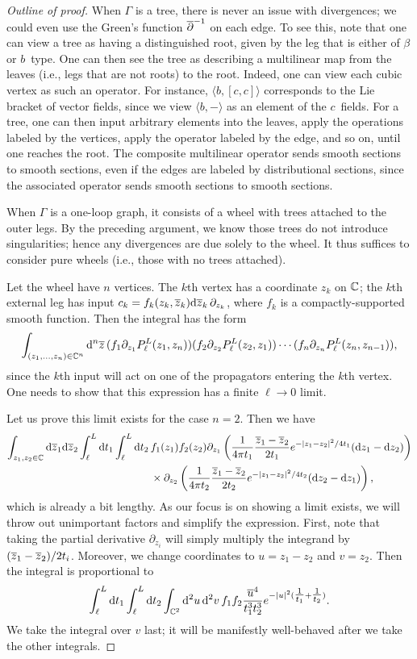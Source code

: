 \begin{proof}[Outline of proof]
When $\Gamma$ is a tree, there is never an issue with divergences; 
we could even use the Green's function $\overline{\partial}^{-1}$ on each edge.
To see this, note that one can view a tree as having a distinguished root,
given by the leg that is either of $\beta$ or $b$~type.
One can then see the tree as describing a multilinear map from the leaves (i.e., legs that are not roots) to the root.
Indeed, one can view each cubic vertex as such an operator.
For instance, $\langle b, [c,c]\rangle$ corresponds to the Lie bracket of vector fields,
since we view $\langle b,-\rangle$ as an element of the $c$~fields.
For a tree, one can then input arbitrary elements into the leaves, 
apply the operations labeled by the vertices,
apply the operator labeled by the edge, and so on,
until one reaches the root.
The composite multilinear operator sends smooth sections to smooth sections,
even if the edges are labeled by distributional sections,
since the associated operator sends smooth sections to smooth sections.

When $\Gamma$ is a one-loop graph, it consists of a wheel with trees attached to the outer legs.
By the preceding argument, we know those trees do not introduce singularities;
hence any divergences are due solely to the wheel.
It thus suffices to consider pure wheels (i.e., those with no trees attached).

Let the wheel have $n$ vertices. 
The $k$th vertex has a coordinate $z_k$ on $\mathbb C$;
the $k$th external leg has input $c_k = f_k(z_k,\overline{z}_k) {\rm d}\overline{z}_k\, \partial_{z_k}$, 
where $f_k$ is a compactly-supported smooth function.
Then the integral has the form
\[
\int_{(z_1,\ldots,z_n) \in \mathbb C^n}{\rm d}^n \overline{z} \,(f_1  \partial_{z_1} P_\ell^L(z_1,z_n))(f_2 \partial_{z_2} P_\ell^L(z_2,z_1)) \cdots (f_n\partial_{z_n} P_\ell^L(z_n,z_{n-1})),
\] 
since the $k$th input will act on one of the propagators entering the $k$th vertex.
One needs to show that this expression has a finite $\ell \to 0$ limit.

Let us prove this limit exists for the case $n=2$.
Then we have
\begin{align*}
\int_{z_1,z_2 \in \mathbb C} {\rm d}\overline{z}_1{\rm d}\overline{z}_2 \int_{\ell}^L {\rm d} t_1 \int_{\ell}^L {\rm d} t_2\, 
& f_1(z_1)f_2(z_2) 
\partial_{z_1} \left(\frac{1}{4\pi t_1} \frac{\overline{z}_1 - \overline{z}_2}{2t_1} e^{-|z_1-z_2|^2/4t_1} ({\rm d} z_1 - {\rm d} z_2) \right)\\
& \times \partial_{z_2} \left(\frac{1}{4\pi t_2} \frac{\overline{z}_1 - \overline{z}_2}{2t_2} e^{-|z_1-z_2|^2/4t_2} ({\rm d} z_2 - {\rm d} z_1) \right),
\end{align*}
which is already a bit lengthy.
As our focus is on showing a limit exists, we will throw out unimportant factors and simplify the expression.
First, note that taking the partial derivative $\partial_{z_i}$ will simply multiply the integrand by $(\overline{z}_1 - \overline{z}_2)/2t_i$.
Moreover, we change coordinates to $u = z_1 - z_2$ and $v = z_2$. 
Then the integral is proportional to
\[
\int_{\ell}^L {\rm d} t_1 \int_{\ell}^L {\rm d} t_2\int_{\mathbb C^2} {\rm d}^2 u \, {\rm d}^2 v \, f_1 f_2 \frac{\overline{u}^4}{t_1^3 t_2^3} e^{-|u|^2(\tfrac{1}{t_1} + \tfrac{1}{t_2})}.
\]
We take the integral over $v$ last;
it will be manifestly well-behaved after we take the other integrals.


\end{proof}
